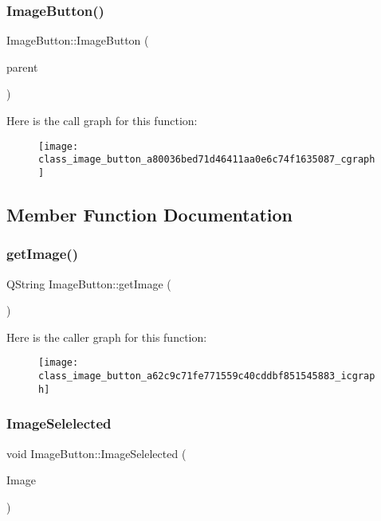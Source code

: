 \subsubsection{Image\+Button()}
{\footnotesize\ttfamily Image\+Button\+::\+Image\+Button (\begin{DoxyParamCaption}\item[{Q\+Widget $\ast$}]{parent }\end{DoxyParamCaption})}

Here is the call graph for this function\+:\nopagebreak
\begin{figure}[H]
\begin{center}
\leavevmode
\texttt{[image: class\_image\_button\_a80036bed71d46411aa0e6c74f1635087\_cgraph]}
\end{center}
\end{figure}


\subsection{Member Function Documentation}
\mbox{\label{class_image_button_a62c9c71fe771559c40cddbf851545883}} 
\subsubsection{get\+Image()}
{\footnotesize\ttfamily Q\+String Image\+Button\+::get\+Image (\begin{DoxyParamCaption}{ }\end{DoxyParamCaption})}

Here is the caller graph for this function\+:\nopagebreak
\begin{figure}[H]
\begin{center}
\leavevmode
\texttt{[image: class\_image\_button\_a62c9c71fe771559c40cddbf851545883\_icgraph]}
\end{center}
\end{figure}
\mbox{\label{class_image_button_a037b5534e2d49776d99b9a4134db5a6f}} 
\subsubsection{Image\+Selelected}
{\footnotesize\ttfamily void Image\+Button\+::\+Image\+Selelected (\begin{DoxyParamCaption}\item[{Q\+String}]{Image }\end{DoxyParamCaption})\hspace{0.3cm}{\ttfamily [signal]}}

